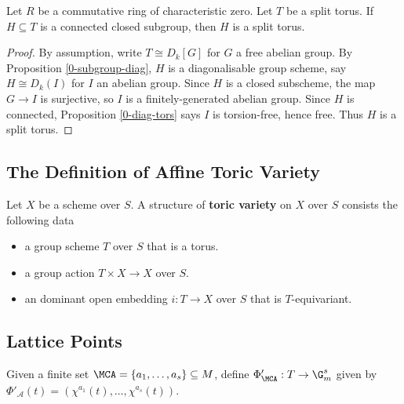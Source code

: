 \begin{proposition}
  \label{1-1-1-subgroup-torus}

  Let $R$ be a commutative ring of characteristic zero.
  Let $T$ be a split torus.
  If $H \subseteq T$ is a connected closed subgroup, then $H$ is a split torus.
\end{proposition}
\begin{proof}

  By assumption, write $T \cong D_k[G]$ for $G$ a free abelian group.
  By Proposition \ref{0-subgroup-diag}, $H$ is a diagonalisable group scheme,
  say $H \cong D_k(I)$ for $I$ an abelian group.
  Since $H$ is a closed subscheme, the map $G \to I$ is surjective,
  so $I$ is a finitely-generated abelian group.
  Since $H$ is connected, Proposition \ref{0-diag-tors} says $I$ is torsion-free, hence free.
  Thus $H$ is a split torus.
\end{proof}


\subsection{The Definition of Affine Toric Variety}


\begin{definition}
  \label{1-1-3-tor-var}
  \leanok
  Let $X$ be a scheme over $S$. A structure of {\bf toric variety} on $X$ over $S$ consists the following data
  \begin{itemize}
    \item a group scheme $T$ over $S$ that is a torus.
    \item a group action $T \times X \to X$ over $S$.
    \item an dominant open embedding $i : T \to X$ over $S$ that is $T$-equivariant.
  \end{itemize}
\end{definition}


\subsection{Lattice Points}

\begin{definition}
  \label{1-1-phiAprime}

  Given a finite set $\MCA = \{a_1, \dotsc, a_s\} \subseteq M$, define $\Phi'_\MCA : T \to \G_m^s$
  given by $\Phi'_{\mathcal A} (t) = (\chi^{a_1} (t), \dotsc, \chi^{a_s} (t))$.
\end{definition}

